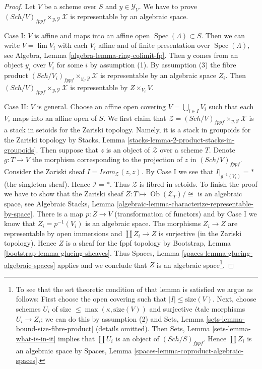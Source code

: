 \documentclass{stacks-project}
\theoremstyle{plain}
\theoremstyle{definition}
\theoremstyle{remark}
\numberwithin{equation}{subsection}
\def\lim{\mathop{\mathrm{lim}}\nolimits}
\def\Spec{\mathop{\mathrm{Spec}}}
\def\Sch{\mathit{Sch}}
\def\Ob{\mathop{\mathrm{Ob}}\nolimits}
\begin{document}
\begin{proof}
Let $V$ be a scheme over $S$ and $y \in \mathcal{Y}_V$. We have to prove
$(\Sch/V)_{fppf} \times_{y, \mathcal{Y}} \mathcal{X}$ is representable
by an algebraic space.

\medskip\noindent
Case I: $V$ is affine and maps into an affine open $\Spec(\Lambda) \subset S$.
Then we can write $V = \lim V_i$ with each $V_i$ affine and of finite
presentation over $\Spec(\Lambda)$, see
Algebra, Lemma \ref{algebra-lemma-ring-colimit-fp}.
Then $y$ comes from an object $y_i$ over $V_i$ for some $i$ by assumption (1).
By assumption (3) the fibre product
$(\Sch/V_i)_{fppf} \times_{y_i, \mathcal{Y}} \mathcal{X}$ is representable
by an algebraic space $Z_i$. Then 
$(\Sch/V)_{fppf} \times_{y, \mathcal{Y}} \mathcal{X}$ is representable
by $Z \times_{V_i} V$.

\medskip\noindent
Case II: $V$ is general. Choose an affine open covering
$V = \bigcup_{i \in I} V_i$ such that each $V_i$ maps into an affine open
of $S$. We first claim
that $\mathcal{Z} = (\Sch/V)_{fppf} \times_{y, \mathcal{Y}} \mathcal{X}$
is a stack in setoids for the Zariski topology. Namely, it is a stack in
groupoids for the Zariski topology by
Stacks, Lemma \ref{stacks-lemma-2-product-stacks-in-groupoids}.
Then suppose that $z$ is an object of $\mathcal{Z}$ over a scheme $T$.
Denote $g : T \to V$ the morphism corresponding to the
projection of $z$ in $(\Sch/V)_{fppf}$. Consider the Zariski sheaf
$\mathit{I} = \mathit{Isom}_{\mathcal{Z}}(z, z)$. By Case I we see that
$\mathit{I}|_{g^{-1}(V_i)} = *$ (the singleton sheaf). Hence
$\mathcal{I} = *$. Thus $\mathcal{Z}$ is fibred in setoids. To finish
the proof we have to show that the Zariski sheaf
$Z : T \mapsto \Ob(\mathcal{Z}_T)/\cong$ is an algebraic space, see
Algebraic Stacks, Lemma
\ref{algebraic-lemma-characterize-representable-by-space}.
There is a map $p : Z \to V$ (transformation of functors) and by Case I
we know that $Z_i = p^{-1}(V_i)$ is an algebraic space. The morphisms
$Z_i \to Z$ are representable by open immersions and
$\coprod Z_i \to Z$ is surjective (in the Zariski topology).
Hence $Z$ is a sheaf for the fppf topology by
Bootstrap, Lemma \ref{bootstrap-lemma-glueing-sheaves}.
Thus Spaces, Lemma \ref{spaces-lemma-glueing-algebraic-spaces}
applies and we conclude that $Z$ is an algebraic space\footnote{
To see that the set theoretic condition of that lemma is satisfied
we argue as follows: First choose the open covering such that
$|I| \leq \text{size}(V)$. Next, choose schemes $U_i$ of size
$\leq \max(\kappa, \text{size}(V))$ and surjective \'etale morphisms
$U_i \to Z_i$; we can do this by assumption (2) and
Sets, Lemma \ref{sets-lemma-bound-size-fibre-product}
(details omitted). Then
Sets, Lemma \ref{sets-lemma-what-is-in-it}
implies that $\coprod U_i$ is an object of $(\Sch/S)_{fppf}$.
Hence $\coprod Z_i$ is an algebraic space by
Spaces, Lemma \ref{spaces-lemma-coproduct-algebraic-spaces}.
}.
\end{proof}
\end{document}
